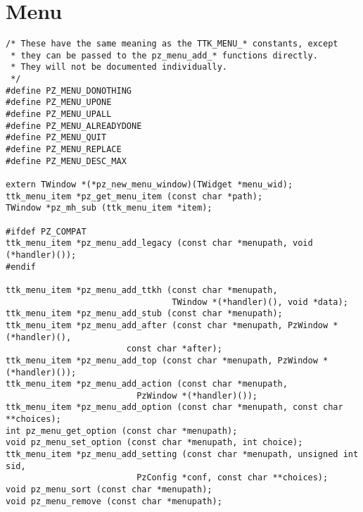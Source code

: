 \documentclass[12pt,letterpaper]{report}
\begin{document}
\section{Menu}
\begin{verbatim}
/* These have the same meaning as the TTK_MENU_* constants, except
 * they can be passed to the pz_menu_add_* functions directly.
 * They will not be documented individually.
 */
#define PZ_MENU_DONOTHING
#define PZ_MENU_UPONE
#define PZ_MENU_UPALL
#define PZ_MENU_ALREADYDONE
#define PZ_MENU_QUIT
#define PZ_MENU_REPLACE
#define PZ_MENU_DESC_MAX

extern TWindow *(*pz_new_menu_window)(TWidget *menu_wid);
ttk_menu_item *pz_get_menu_item (const char *path);
TWindow *pz_mh_sub (ttk_menu_item *item);

#ifdef PZ_COMPAT
ttk_menu_item *pz_menu_add_legacy (const char *menupath, void (*handler)());
#endif

ttk_menu_item *pz_menu_add_ttkh (const char *menupath,
                                 TWindow *(*handler)(), void *data);
ttk_menu_item *pz_menu_add_stub (const char *menupath);
ttk_menu_item *pz_menu_add_after (const char *menupath, PzWindow *(*handler)(),
                        const char *after);
ttk_menu_item *pz_menu_add_top (const char *menupath, PzWindow *(*handler)());
ttk_menu_item *pz_menu_add_action (const char *menupath,
                          PzWindow *(*handler)());
ttk_menu_item *pz_menu_add_option (const char *menupath, const char **choices);
int pz_menu_get_option (const char *menupath);
void pz_menu_set_option (const char *menupath, int choice);
ttk_menu_item *pz_menu_add_setting (const char *menupath, unsigned int sid,
                          PzConfig *conf, const char **choices);
void pz_menu_sort (const char *menupath);
void pz_menu_remove (const char *menupath);
\end{verbatim}
\end{document}
